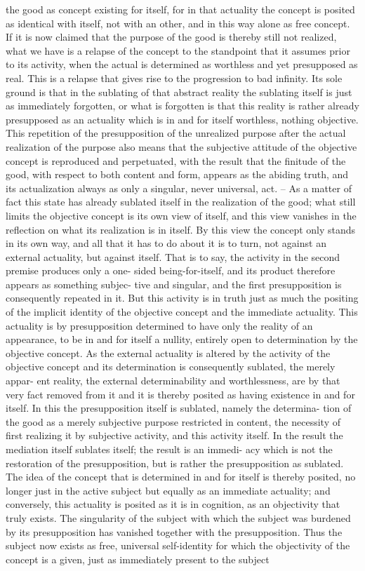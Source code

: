 the good as concept existing for itself, for in that actuality the concept is
posited as identical with itself, not with an other, and in this way alone as
free concept. If it is now claimed that the purpose of the good is thereby
still not realized, what we have is a relapse of the concept to the standpoint
that it assumes prior to its activity, when the actual is determined as
worthless and yet presupposed as real. This is a relapse that gives rise to the
progression to bad infinity. Its sole ground is that in the sublating of that
abstract reality the sublating itself is just as immediately forgotten, or what
is forgotten is that this reality is rather already presupposed as an actuality
which is in and for itself worthless, nothing objective. This repetition of
the presupposition of the unrealized purpose after the actual realization of
the purpose also means that the subjective attitude of the objective concept
is reproduced and perpetuated, with the result that the finitude of the good,
with respect to both content and form, appears as the abiding truth, and
its actualization always as only a singular, never universal, act. – As a matter
of fact this state has already sublated itself in the realization of the good;
what still limits the objective concept is its own view of itself, and this view
vanishes in the reflection on what its realization is in itself. By this view the
concept only stands in its own way, and all that it has to do about it is to
turn, not against an external actuality, but against itself.
That is to say, the activity in the second premise produces only a one-
sided being-for-itself, and its product therefore appears as something subjec-
tive and singular, and the first presupposition is consequently repeated in it.
But this activity is in truth just as much the positing of the implicit identity
of the objective concept and the immediate actuality. This actuality is by
presupposition determined to have only the reality of an appearance, to be
in and for itself a nullity, entirely open to determination by the objective
concept. As the external actuality is altered by the activity of the objective
concept and its determination is consequently sublated, the merely appar-
ent reality, the external determinability and worthlessness, are by that very
fact removed from it and it is thereby posited as having existence in and for
itself. In this the presupposition itself is sublated, namely the determina-
tion of the good as a merely subjective purpose restricted in content, the
necessity of first realizing it by subjective activity, and this activity itself.
In the result the mediation itself sublates itself; the result is an immedi-
acy which is not the restoration of the presupposition, but is rather the
presupposition as sublated. The idea of the concept that is determined in
and for itself is thereby posited, no longer just in the active subject but
equally as an immediate actuality; and conversely, this actuality is posited
as it is in cognition, as an objectivity that truly exists. The singularity of
the subject with which the subject was burdened by its presupposition has
vanished together with the presupposition. Thus the subject now exists
as free, universal self-identity for which the objectivity of the concept is a
given, just as immediately present to the subject

